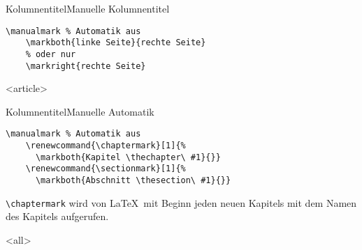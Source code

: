 \begin{frame}[fragile,t]{Kolumnentitel}{Manuelle Kolumnentitel}
  \xxx\xxx


  \xxx

  \begin{lstlisting}[gobble=4]
    \manualmark % Automatik aus
    \markboth{linke Seite}{rechte Seite}
    % oder nur
    \markright{rechte Seite}
  \end{lstlisting}
\end{frame}

\mode
<article>

\begin{frame}[fragile]{Kolumnentitel}{Manuelle Automatik}
  \begin{lstlisting}[gobble=4]
    \manualmark % Automatik aus
    \renewcommand{\chaptermark}[1]{%
      \markboth{Kapitel \thechapter\ #1}{}}
    \renewcommand{\sectionmark}[1]{%
      \markboth{Abschnitt \thesection\ #1}{}}
  \end{lstlisting}
  \lstinline-\chaptermark- wird von \LaTeX\ mit Beginn
  jeden neuen Kapitels mit dem Namen des Kapitels aufgerufen.
\end{frame}

\mode
<all>

